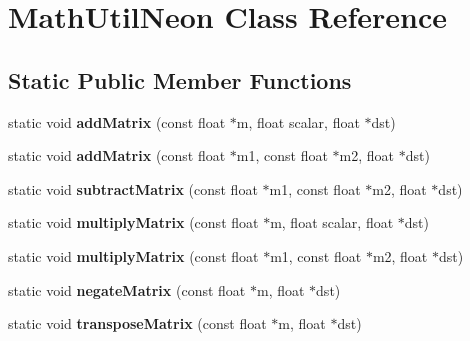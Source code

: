 \hypertarget{classMathUtilNeon}{}\section{Math\+Util\+Neon Class Reference}
\label{classMathUtilNeon}
\subsection*{Static Public Member Functions}
\begin{DoxyCompactItemize}
\item 
\mbox{\label{classMathUtilNeon_acc9fcca53ae434a147794168c4d67b6a}} 
static void {\bfseries add\+Matrix} (const float $\ast$m, float scalar, float $\ast$dst)
\item 
\mbox{\label{classMathUtilNeon_a48bddbd90c9e8a7732c07bdac6026500}} 
static void {\bfseries add\+Matrix} (const float $\ast$m1, const float $\ast$m2, float $\ast$dst)
\item 
\mbox{\label{classMathUtilNeon_a9cc1d094ad4312cfad1aac8d031dd96c}} 
static void {\bfseries subtract\+Matrix} (const float $\ast$m1, const float $\ast$m2, float $\ast$dst)
\item 
\mbox{\label{classMathUtilNeon_aa5dc26af9503e527db911560298e5650}} 
static void {\bfseries multiply\+Matrix} (const float $\ast$m, float scalar, float $\ast$dst)
\item 
\mbox{\label{classMathUtilNeon_a9560f7e5168895a9c254a545f2ef576e}} 
static void {\bfseries multiply\+Matrix} (const float $\ast$m1, const float $\ast$m2, float $\ast$dst)
\item 
\mbox{\label{classMathUtilNeon_a0789cd2dc50e7d52621c8abafb9a64e2}} 
static void {\bfseries negate\+Matrix} (const float $\ast$m, float $\ast$dst)
\item 
\mbox{\label{classMathUtilNeon_a31074b569f59c276b6e155d574d1cafd}} 
static void {\bfseries transpose\+Matrix} (const float $\ast$m, float $\ast$dst)
\item 
\mbox{\label{classMathUtilNeon_a50c4106875cdeb65d48b0e468498826d}} 

\end{DoxyCompactItemize}
